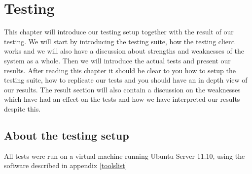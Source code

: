 \section{Testing}\label{Testing}
	This chapter will introduce our testing setup together with the result of our testing. We will start by introducing the testing suite, how the testing client works and we will also have a discussion about strengths and weaknesses of the system as a whole. Then we will introduce the actual tests and present our results. After reading this chapter it should be clear to you how to setup the testing suite, how to replicate our tests and you should have an in depth view of our results. The result section will also contain a discussion on the weaknesses which have had an effect on the tests and how we have interpreted our results despite this.
	    
    \subsection{About the testing setup}\label{Testing:About}
        All tests were run on a virtual machine running Ubuntu Server 11.10, using the software described in appendix \ref{toolslist}
    	
 		
    	
    	
	

    

